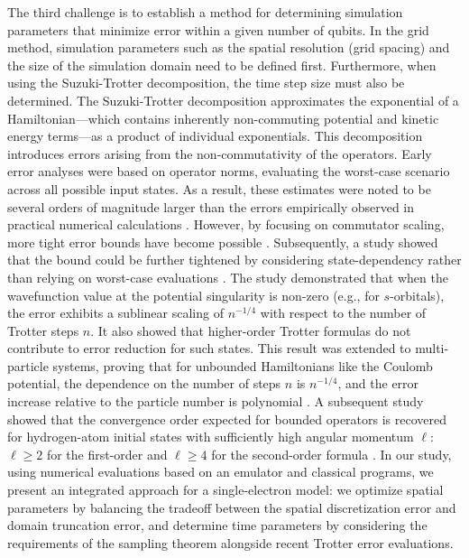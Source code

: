 \documentclass[manuscript_main.tex]{subfiles}
\begin{document}
The third challenge is to establish a method for determining simulation
parameters that minimize error within a given number of qubits. In the grid
method, simulation parameters such as the spatial resolution (grid spacing) and
the size of the simulation domain need to be defined first. Furthermore, when
using the Suzuki-Trotter decomposition, the time step size must also be
determined. The Suzuki-Trotter decomposition approximates the exponential of a
Hamiltonian---which contains inherently non-commuting potential and kinetic
energy terms---as a product of individual exponentials. This decomposition
introduces errors arising from the non-commutativity of the operators. Early
error analyses were based on operator norms, evaluating the worst-case scenario
across all possible input states. As a result, these estimates were noted to be
several orders of magnitude larger than the errors empirically observed in
practical numerical calculations \cite{Childs2021.PhysRevX.11.011020}. However,
by focusing on commutator scaling, more tight error bounds have become possible
\cite{Childs2021.PhysRevX.11.011020}. Subsequently, a study showed that the
bound could be further tightened by considering state-dependency rather than
relying on worst-case evaluations \cite{Burgarth2024.PhysRevResearch.6.043155}.
The study demonstrated that when the wavefunction value at the potential
singularity is non-zero (e.g., for $s$-orbitals), the error exhibits a sublinear
scaling of $n^{-1/4}$ with respect to the number of Trotter steps $n$. It also
showed that higher-order Trotter formulas do not contribute to error reduction
for such states. This result was extended to multi-particle systems, proving
that for unbounded Hamiltonians like the Coulomb potential, the dependence on
the number of steps $n$ is $n^{-1/4}$, and the error increase relative to the
particle number is polynomial \cite{fang2026trotter}. A subsequent study showed
that the convergence order expected for bounded operators is recovered for
hydrogen-atom initial states with sufficiently high angular momentum $\ell$:
$\ell\ge 2$ for the first-order and $\ell \ge 4$ for the second-order
formula \cite{fangwu2026trotterization}. In our study, using numerical
evaluations based on an emulator and classical programs, we present an
integrated approach for a single-electron model: we optimize spatial parameters
by balancing the tradeoff between the spatial discretization error and domain
truncation error, and determine time parameters by considering the requirements
of the sampling theorem alongside recent Trotter error evaluations.

\ifSubfilesClassLoaded{}{}
\end{document}

